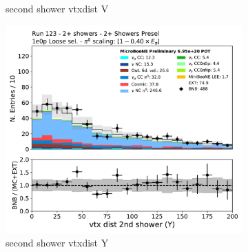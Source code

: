 \begin{figure}[H]
\begin{subfigure}{0.3\textwidth}
    \caption{second shower vtxdist V}
    \end{subfigure}
    \begin{subfigure}{0.3\textwidth}
    \includegraphics[width=1.0\textwidth]{Sidebands/Figures/TwoShr_1e0pSel/loose/secondshower_Y_vtxdist.pdf}
    \caption{second shower vtxdist Y}
    \end{subfigure}
    \caption{} 
    \label{fig:HE_1eNp_1}
\end{figure}


